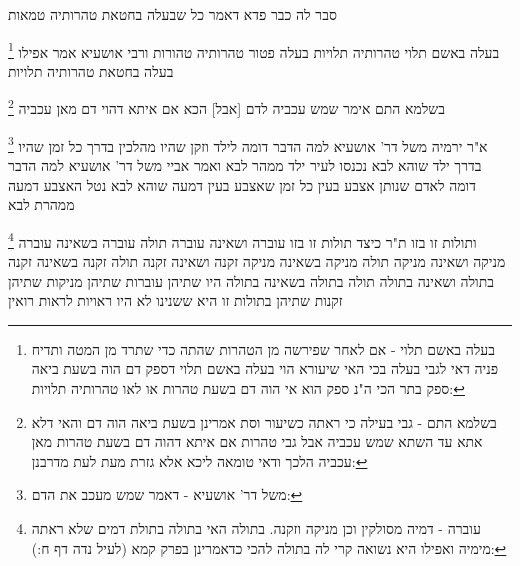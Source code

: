 \documentclass[12pt, openany]{book}
\newcommand{\footnotecomment}[1]{
	\renewcommand\thefootnote{}
	\footnote{#1}}
\newcommand{\commenta}[1]{\footnotecomment{#1}}
\begin{document}
{סבר לה כבר פדא דאמר כל שבעלה בחטאת טהרותיה טמאות
\commenta{בעלה באשם תלוי - אם לאחר שפירשה מן הטהרות שהתה כדי שתרד מן המטה ותדיח פניה דאי לגבי בעלה בכי האי שיעורא הוי בעלה באשם תלוי דספק דם הוה בשעת ביאה ספק בתר הכי ה"נ ספק הוא אי הוה דם בשעת טהרות או לאו טהרותיה תלויות:}
בעלה באשם תלוי טהרותיה תלויות בעלה פטור טהרותיה טהורות 
ורבי אושעיא אמר אפילו בעלה בחטאת טהרותיה תלויות 
\commenta{בשלמא התם - גבי בעילה כי ראתה כשיעור וסת אמרינן בשעת ביאה הוה דם והאי דלא אתא עד השתא שמש עכביה אבל גבי טהרות אם איתא דהוה דם בשעת טהרות מאן עכביה הלכך ודאי טומאה ליכא אלא גזרת מעת לעת מדרבנן:}
בשלמא התם אימר שמש עכביה לדם [אבל] הכא אם איתא דהוי דם מאן עכביה 
\commenta{משל דר' אושעיא - דאמר שמש מעכב את הדם:}
א"ר ירמיה משל דר' אושעיא למה הדבר דומה לילד וזקן שהיו מהלכין בדרך כל זמן שהיו בדרך ילד שוהא לבא נכנסו לעיר ילד ממהר לבא ואמר אביי משל דר' אושעיא למה הדבר דומה לאדם שנותן אצבע בעין כל זמן שאצבע בעין דמעה שוהא לבא נטל האצבע דמעה ממהרת לבא
\commenta{עוברה - דמיה מסולקין וכן מניקה וזקנה. בתולה האי בתולה בתולת דמים שלא ראתה מימיה ואפילו היא נשואה קרי לה בתולה להכי כדאמרינן בפרק קמא (לעיל נדה דף ח:):}
ותולות זו בזו ת"ר כיצד תולות זו בזו עוברה ושאינה עוברה תולה עוברה בשאינה עוברה
מניקה ושאינה מניקה תולה מניקה בשאינה מניקה זקנה ושאינה זקנה תולה זקנה בשאינה זקנה בתולה ושאינה בתולה תולה בתולה בשאינה בתולה 
היו שתיהן עוברות שתיהן מניקות שתיהן זקנות שתיהן בתולות זו היא ששנינו לא היו ראויות לראות רואין}
\end{document}
